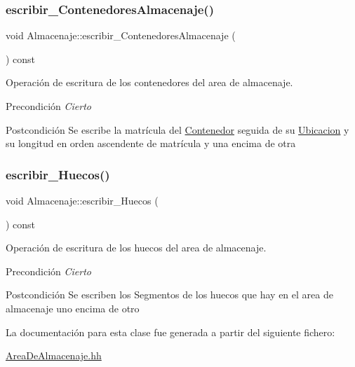 \subsubsection{\texorpdfstring{escribir\+\_\+\+Contenedores\+Almacenaje()}{escribir\_ContenedoresAlmacenaje()}}
{\footnotesize\ttfamily void Almacenaje\+::escribir\+\_\+\+Contenedores\+Almacenaje (\begin{DoxyParamCaption}{ }\end{DoxyParamCaption}) const}



Operación de escritura de los contenedores del area de almacenaje. 

\begin{DoxyPrecond}{Precondición}
{\itshape Cierto} 
\end{DoxyPrecond}
\begin{DoxyPostcond}{Postcondición}
Se escribe la matrícula del \hyperlink{class_contenedor}{Contenedor} seguida de su \hyperlink{class_ubicacion}{Ubicacion} y su longitud en orden ascendente de matrícula y una encima de otra 
\end{DoxyPostcond}
\mbox{\label{class_almacenaje_a29e009f94265ea34b860f0918d3e1992}} 
\subsubsection{\texorpdfstring{escribir\+\_\+\+Huecos()}{escribir\_Huecos()}}
{\footnotesize\ttfamily void Almacenaje\+::escribir\+\_\+\+Huecos (\begin{DoxyParamCaption}{ }\end{DoxyParamCaption}) const}



Operación de escritura de los huecos del area de almacenaje. 

\begin{DoxyPrecond}{Precondición}
{\itshape Cierto} 
\end{DoxyPrecond}
\begin{DoxyPostcond}{Postcondición}
Se escriben los Segmentos de los huecos que hay en el area de almacenaje uno encima de otro 
\end{DoxyPostcond}


La documentación para esta clase fue generada a partir del siguiente fichero\+:\begin{DoxyCompactItemize}
\item 
\hyperlink{_area_de_almacenaje_8hh}{Area\+De\+Almacenaje.\+hh}\end{DoxyCompactItemize}
